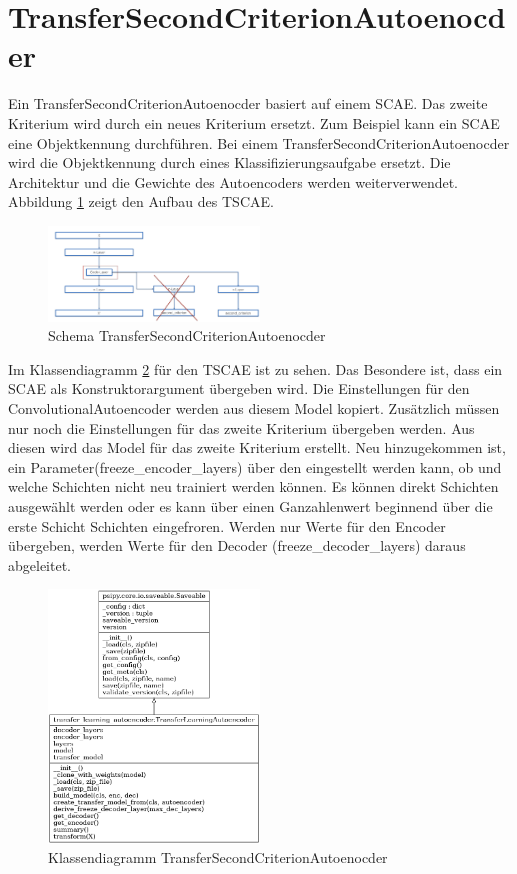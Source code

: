 	\section{TransferSecondCriterionAutoenocder}
	\label{sec:TransferSecondCriterionAutoenocder}		
	Ein TransferSecondCriterionAutoenocder basiert auf einem SCAE. Das zweite Kriterium wird durch ein neues Kriterium ersetzt. Zum Beispiel kann ein SCAE eine Objektkennung durchführen. Bei einem TransferSecondCriterionAutoenocder wird die Objektkennung durch eines Klassifizierungsaufgabe ersetzt. Die Architektur und die Gewichte des Autoencoders werden weiterverwendet. Abbildung \ref{img:SchemaTSCAE} zeigt den Aufbau des TSCAE.
	\begin{figure}[h]
		\centering
		\includegraphics[width=0.5\textwidth, center]{bilder/Schema_Autoencoders/Schema_TSCAE.png}
		\caption[Schema TransferSecondCriterionAutoenocder]{Schema TransferSecondCriterionAutoenocder}
		\label{img:SchemaTSCAE}
	\end{figure}  
	Im Klassendiagramm \ref{img:KlassendiagrammTransferSecondCriterionAutoenocder} für den TSCAE ist zu sehen. Das Besondere ist, dass ein SCAE als Konstruktorargument übergeben wird. Die Einstellungen für den ConvolutionalAutoencoder werden aus diesem Model kopiert. Zusätzlich müssen nur noch die Einstellungen für das zweite Kriterium übergeben werden. Aus diesen wird das Model für das zweite Kriterium erstellt.
	Neu hinzugekommen ist, ein Parameter(freeze\_encoder\_layers) über den eingestellt werden kann, ob und welche Schichten nicht neu trainiert werden können. Es können direkt Schichten ausgewählt werden oder es kann über einen Ganzahlenwert beginnend über die erste Schicht Schichten eingefroren. Werden nur Werte für den Encoder übergeben, werden Werte für den Decoder (freeze\_decoder\_layers) daraus abgeleitet. 
	\begin{figure}[h]
		\centering
		\includegraphics[width=0.5\textwidth, center]{bilder/Klassendiagramme/Klassendiagramm_TLCSCAE.png}
		\caption[Klassendiagramm TransferSecondCriterionAutoenocder]{Klassendiagramm TransferSecondCriterionAutoenocder}
		\label{img:KlassendiagrammTransferSecondCriterionAutoenocder}
	\end{figure}  
